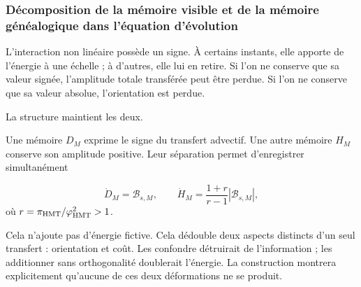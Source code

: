 \subsubsection{Décomposition de la mémoire visible et de la mémoire généalogique dans l’équation d’évolution}
L’interaction non linéaire possède un signe. À certains instants, elle apporte de l’énergie à une échelle ; à d’autres, elle lui en retire. Si l’on ne conserve que sa valeur signée, l’amplitude totale transférée peut être perdue. Si l’on ne conserve que sa valeur absolue, l’orientation est perdue.\par
La structure maintient les deux.\par
Une mémoire \(D_M\) exprime le signe du transfert advectif. Une autre mémoire \(H_M\) conserve son amplitude positive. Leur séparation permet d’enregistrer simultanément\par
\[
\dot D_M=\mathscr B_{s,M},
\qquad
\dot H_M=\frac{1+r}{r-1}|\mathscr B_{s,M}|,
\]
où \(r=\pi_{\rm HMT}/\varphi_{\rm HMT}^2>1\).\par
Cela n’ajoute pas d’énergie fictive. Cela dédouble deux aspects distincts d’un seul transfert : orientation et coût. Les confondre détruirait de l’information ; les additionner sans orthogonalité doublerait l’énergie. La construction montrera explicitement qu’aucune de ces deux déformations ne se produit.\par
{}
